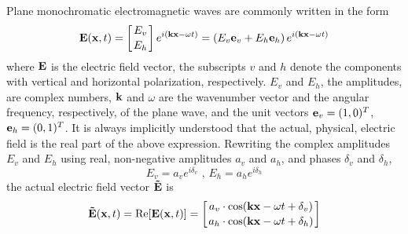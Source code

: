 \label{sec:polarization:monochrom}

Plane monochromatic electromagnetic waves are commonly written in the form
\begin{equation} 
  \label{eq:polarization:e_field}
  \mathbf{E}(\mathbf{x},t) 
   = \left[E_v \atop E_h\right] e^{i(\mathbf{k}\mathbf{x} - \omega t)}
   = \left(E_v \mathbf{e}_v +  E_h \mathbf{e}_h \right) 
      e^{i(\mathbf{k}\mathbf{x} - \omega t)}
\end{equation}
where $\mathbf{E}$ is the electric field vector, the subscripts $v$
and $h$ denote the components with vertical and horizontal
polarization, respectively. $E_v$ and $E_h$, the amplitudes, are
complex numbers, $\mathbf{k}$ and $\omega$ are the wavenumber vector
and the angular frequency, respectively, of the plane wave, and the
unit vectors $\mathbf{e}_v = (1,0)^T$, $\mathbf{e}_h = (0,1)^T$.  It is always
implicitly understood that the actual, physical, electric field is the
real part of the above expression. Rewriting the complex amplitudes
$E_v$ and $E_h$ using real, non-negative amplitudes $a_v$ and $a_h$, and
phases $\delta_v$ and $\delta_h$,
\begin{equation}
  \label{eq:polarization:compl_ampl}
  E_v=a_v e^{i\delta_v}\mbox{ , }
  E_h=a_h e^{i\delta_h}
\end{equation}
the actual electric field vector $\mathbf{\tilde{E}}$ is
\begin{equation}
  \label{eq:polarization:actual_efield}
  \mathbf{\tilde{E}}(\mathbf{x},t) = \mathrm{Re}[\mathbf{E}(\mathbf{x},t)] 
    = \left[a_v\cdot \cos(\mathbf{k}\mathbf{x} - \omega t + \delta_v) 
                       \atop 
            a_h\cdot \cos(\mathbf{k}\mathbf{x} - \omega t + \delta_h) 
       \right] 
\end{equation}

